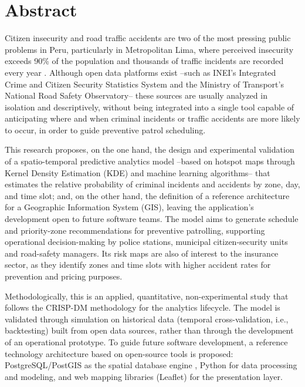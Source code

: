 \documentclass[12pt,letterpaper]{report}
\begin{document}
\newpage

\chapter*{Abstract}

Citizen insecurity and road traffic accidents are two of the most pressing public problems in Peru, particularly in Metropolitan Lima, where perceived insecurity exceeds 90\% of the population and thousands of traffic incidents are recorded every year \citep{inei2022sistema,mtc2024observatorio}. Although open data platforms exist --such as INEI's Integrated Crime and Citizen Security Statistics System and the Ministry of Transport's National Road Safety Observatory-- these sources are usually analyzed in isolation and descriptively, without being integrated into a single tool capable of anticipating where and when criminal incidents or traffic accidents are more likely to occur, in order to guide preventive patrol scheduling.

This research proposes, on the one hand, the design and experimental validation of a spatio-temporal predictive analytics model --based on hotspot maps through Kernel Density Estimation (KDE) and machine learning algorithms-- that estimates the relative probability of criminal incidents and accidents by zone, day, and time slot; and, on the other hand, the definition of a reference architecture for a Geographic Information System (GIS), leaving the application's development open to future software teams. The model aims to generate schedule and priority-zone recommendations for preventive patrolling, supporting operational decision-making by police stations, municipal citizen-security units and road-safety managers. Its risk maps are also of interest to the insurance sector, as they identify zones and time slots with higher accident rates for prevention and pricing purposes.

Methodologically, this is an applied, quantitative, non-experimental study that follows the CRISP-DM methodology \citep{crispdm2000} for the analytics lifecycle. The model is validated through simulation on historical data (temporal cross-validation, i.e., backtesting) built from open data sources, rather than through the development of an operational prototype. To guide future software development, a reference technology architecture based on open-source tools is proposed: PostgreSQL/PostGIS as the spatial database engine \citep{postgis2024}, Python for data processing and modeling, and web mapping libraries (Leaflet) for the presentation layer.
\end{document}
